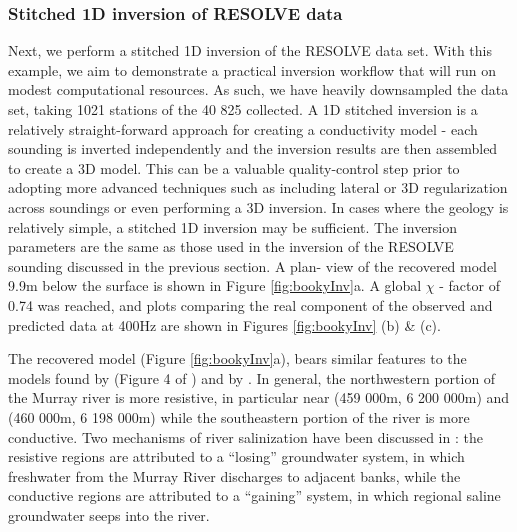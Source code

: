 \documentclass[preprint,review,3p,times,onecolumn,authoryear]{elsarticle}
\begin{document}
\subsubsection{Stitched 1D inversion of RESOLVE data}

Next, we perform a stitched 1D inversion of the RESOLVE data set. With this
example, we aim to demonstrate a practical inversion workflow that will run on
modest computational resources. As such, we have heavily downsampled the data
set, taking 1021 stations of the 40 825 collected. A 1D stitched inversion is
a relatively straight-forward approach for creating a conductivity model -
each sounding is inverted independently and the inversion results are then
assembled to create a 3D model. This can be a valuable quality-control step
prior to adopting more advanced techniques such as including lateral or 3D
regularization across soundings or even performing a 3D inversion. In cases
where the geology is relatively simple, a stitched 1D inversion may be
sufficient. The inversion parameters are the same as those used in the
inversion of the RESOLVE sounding discussed in the previous section. A plan-
view of the recovered model 9.9m below the surface is shown in Figure
\ref{fig:bookyInv}a. A global $\chi$ - factor of 0.74 was reached,
and plots comparing the real component of the observed and
predicted data at 400Hz are shown in Figures \ref{fig:bookyInv} (b) \& (c).

The recovered model (Figure \ref{fig:bookyInv}a), bears similar features to
the models found by \cite{Viezzoli2010} (Figure 4 of \cite{Viezzoli2010}) and by \cite{Yang2017}. In
general, the northwestern portion of the Murray river is more resistive, in
particular near (459 000m, 6 200 000m) and (460 000m, 6 198 000m) while the
southeastern portion of the river is more conductive. Two mechanisms of river
salinization have been discussed in \cite{Munday2006, Viezzoli2010}: the
resistive regions are attributed to a ``losing'' groundwater system, in which
freshwater from the Murray River discharges to adjacent banks, while the
conductive regions are attributed to a ``gaining'' system, in which regional
saline groundwater seeps into the river.
\end{document}
